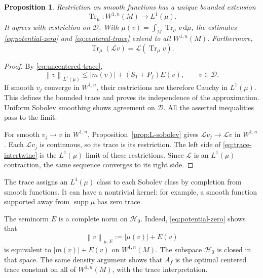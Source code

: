 \documentclass[11pt,reqno]{amsart}
\theoremstyle{plain}
\newtheorem{proposition}[theorem]{Proposition}
\theoremstyle{definition}
\theoremstyle{remark}
\newcommand{\Lop}{\mathcal L}
\newcommand{\Hcal}{\mathcal H}
\newcommand{\Dcal}{\mathcal D}
\newcommand{\Tr}{\operatorname{Tr}_{\mu}}
\newcommand{\norm}[1]{\left\lVert #1\right\rVert}
\newcommand{\dd}{\mathrm d}
\DeclareMathOperator{\supp}{supp}
\numberwithin{equation}{section}
\begin{document}
\begin{proposition}\label{prop:trace-extension}
Restriction on smooth functions has a unique bounded extension
\[
 \Tr\colon W^{1,n}(M)\longrightarrow L^1(\mu).
\]
It agrees with restriction on $\Dcal$. With $\mu(v)=\int_M\Tr v\,\dd\mu$, the estimates \eqref{eq:potential-zero} and \eqref{eq:centered-trace} extend to all $W^{1,n}(M)$. Furthermore,
\begin{equation}\label{eq:trace-intertwine}
 \Tr(\Lop v)=\Lop(\Tr v).
\end{equation}
\end{proposition}

\begin{proof}
By \eqref{eq:uncentered-trace},
\[
 \norm{v}_{L^1(\mu)}\le |m(v)|+(S_1+P_f)E(v),\qquad v\in\Dcal.
\]
If smooth $v_j$ converge in $W^{1,n}$, their restrictions are therefore Cauchy in $L^1(\mu)$. This defines the bounded trace and proves its independence of the approximation. Uniform Sobolev smoothing shows agreement on $\Dcal$. All the asserted inequalities pass to the limit.

For smooth $v_j\to v$ in $W^{1,n}$, Proposition~\ref{prop:L-sobolev} gives $\Lop v_j\to\Lop v$ in $W^{1,n}$. Each $\Lop v_j$ is continuous, so its trace is its restriction. The left side of \eqref{eq:trace-intertwine} is the $L^1(\mu)$ limit of these restrictions. Since $\Lop$ is an $L^1(\mu)$ contraction, the same sequence converges to its right side.
\end{proof}

The trace assigns an $L^1(\mu)$ class to each Sobolev class by completion from smooth functions. It can have a nontrivial kernel: for example, a smooth function supported away from $\supp\mu$ has zero trace.

The seminorm $E$ is a complete norm on $\Hcal_0$. Indeed, \eqref{eq:potential-zero} shows that
\begin{equation}\label{eq:norm-equivalence}
 \norm{v}_{\mu,E}:=|\mu(v)|+E(v)
\end{equation}
is equivalent to $|m(v)|+E(v)$ on $W^{1,n}(M)$. The subspace $\Hcal_0$ is closed in that space. The same density argument shows that $A_f$ is the optimal centered trace constant on all of $W^{1,n}(M)$, with the trace interpretation.
\end{document}
